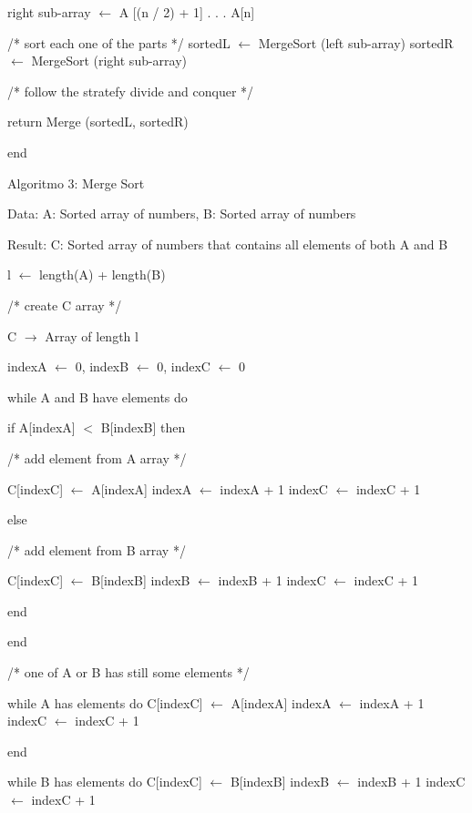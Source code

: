 \documentclass{article} %
\begin{document}
\noindent right sub-array $\mathrm{\leftarrow}$ A [(n / 2) + 1] . . . A[n]

\noindent /* sort each one of the parts */ sortedL $\mathrm{\leftarrow}$ MergeSort (left sub-array) sortedR $\mathrm{\leftarrow}$ MergeSort (right sub-array)

\noindent /* follow the stratefy divide and conquer */

\noindent return Merge (sortedL, sortedR)

\noindent end

\noindent Algoritmo 3: Merge Sort

\noindent 

\noindent Data:  A: Sorted array of numbers, B: Sorted array of numbers

\noindent Result:  C: Sorted array of numbers that contains all elements of both A and B

\noindent l $\mathrm{\leftarrow}$ length(A) + length(B)

\noindent /* create C array */

\noindent C $\mathrm{\to}$ Array of length l

\noindent indexA $\mathrm{\leftarrow}$ 0, indexB $\mathrm{\leftarrow}$ 0, indexC $\mathrm{\leftarrow}$ 0

\noindent while A and B have elements do

\noindent if A[indexA] $\mathrm{<}$ B[indexB] then

\noindent /* add element from A array */

\noindent C[indexC] $\mathrm{\leftarrow}$ A[indexA] indexA $\mathrm{\leftarrow}$ indexA + 1 indexC $\mathrm{\leftarrow}$ indexC + 1

\noindent else

\noindent /* add element from B array */

\noindent C[indexC] $\mathrm{\leftarrow}$ B[indexB] indexB $\mathrm{\leftarrow}$ indexB + 1 indexC $\mathrm{\leftarrow}$ indexC + 1

\noindent end

\noindent end

\noindent /* one of A or B has still some elements */

\noindent while A has elements do C[indexC] $\mathrm{\leftarrow}$ A[indexA] indexA $\mathrm{\leftarrow}$ indexA + 1 indexC $\mathrm{\leftarrow}$ indexC + 1

\noindent end

\noindent while B has elements do C[indexC] $\mathrm{\leftarrow}$ B[indexB] indexB $\mathrm{\leftarrow}$ indexB + 1 indexC $\mathrm{\leftarrow}$ indexC + 1
\end{document}
